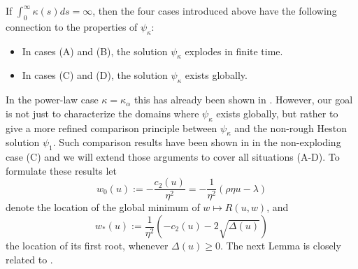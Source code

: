 \documentclass[12pt,a4paper]{amsart}
\numberwithin{equation}{section}
\numberwithin{equation}{section}
\theoremstyle{nonumberplain}
\begin{document}
If $\int_0^\infty \kappa(s) ds = \infty$, then the four cases introduced above have the following connection to the properties of $\psi_\kappa$:
\begin{itemize}
\item In cases (A) and (B), the solution $\psi_\kappa$ explodes in finite time. 
\item In cases (C) and (D), the solution $\psi_\kappa$ exists globally. 
\end{itemize}
In the power-law case $\kappa = \kappa_\alpha$ this has already been shown in \cite{gerhold2018moment}. However, our goal is not just to characterize the domains where $\psi_\kappa$ exists globally, but rather to give a more refined comparison principle between $\psi_\kappa$ and the non-rough Heston solution $\psi_1$. Such comparison results have been shown in \cite[Appendix~A]{gatheral2018affine} in the non-exploding case (C) and we will extend those arguments to cover all situations (A-D).  To formulate these results let
\begin{equation*}
	w_0(u) := -\frac{c_2(u)}{\eta^2} =  -\frac{1}{\eta^2}(\rho \eta u - \lambda) 
\end{equation*}
denote the location of the global minimum of $w \mapsto R(u,w)$, and 
\begin{equation*}
	w_{*}(u):= \frac{1}{\eta^2}\left(-c_2(u)-2\sqrt{\Delta(u)}\right)
\end{equation*}
 the location of its first root, whenever $\Delta(u) \ge 0$. The next Lemma is closely related to \cite[Lem.~A.3]{gatheral2018affine}.
\end{document}
